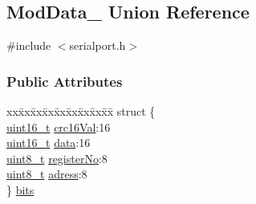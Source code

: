\hypertarget{unionModData__}{}\subsection{Mod\+Data\+\_\+ Union Reference}
\label{unionModData__}


{\ttfamily \#include $<$serialport.\+h$>$}

\subsubsection*{Public Attributes}
\begin{DoxyCompactItemize}
\item 
\begin{tabbing}
xx\=xx\=xx\=xx\=xx\=xx\=xx\=xx\=xx\=\kill
struct \{\\
\>\mbox{\hyperlink{settings_8h_a017dd44e68049ffdd31500a8cd01ba68}{uint16\_t}} \mbox{\hyperlink{unionModData___a806e3925e1b4722056cb8f0b46ab9407}{crc16Val}}:16\\
\>\mbox{\hyperlink{settings_8h_a017dd44e68049ffdd31500a8cd01ba68}{uint16\_t}} \mbox{\hyperlink{unionModData___a9da744053275e3ee8e1e8a64e8bed7c3}{data}}:16\\
\>\mbox{\hyperlink{settings_8h_a48091a1e52849b0871df2f7081be2e38}{uint8\_t}} \mbox{\hyperlink{unionModData___acf7fca8058f75c693373e96038158eb8}{registerNo}}:8\\
\>\mbox{\hyperlink{settings_8h_a48091a1e52849b0871df2f7081be2e38}{uint8\_t}} \mbox{\hyperlink{unionModData___afaeee3115b1424db2b572f644ca9d179}{adress}}:8\\
\} \mbox{\hyperlink{unionModData___aa4dd5ccccd7727341bbc1c0027521a66}{bits}}\\


\end{tabbing}
\end{DoxyCompactItemize}
